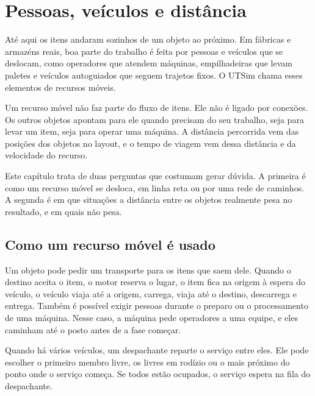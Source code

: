 \chapter{Pessoas, veículos e distância}
\label{cap-moveis}


Até aqui os itens andaram sozinhos de um objeto ao próximo. Em fábricas e armazéns reais, boa parte do trabalho é feita por pessoas e veículos que se deslocam, como operadores que atendem máquinas, empilhadeiras que levam paletes e veículos autoguiados que seguem trajetos fixos. O UTSim chama esses elementos de recursos móveis.

Um recurso móvel não faz parte do fluxo de itens. Ele não é ligado por conexões. Os outros objetos apontam para ele quando precisam do seu trabalho, seja para levar um item, seja para operar uma máquina. A distância percorrida vem das posições dos objetos no layout, e o tempo de viagem vem dessa distância e da velocidade do recurso.

Este capítulo trata de duas perguntas que costumam gerar dúvida. A primeira é como um recurso móvel se desloca, em linha reta ou por uma rede de caminhos. A segunda é em que situações a distância entre os objetos realmente pesa no resultado, e em quais não pesa.

\section{Como um recurso móvel é usado}

Um objeto pode pedir um transporte para os itens que saem dele. Quando o destino aceita o item, o motor reserva o lugar, o item fica na origem à espera do veículo, o veículo viaja até a origem, carrega, viaja até o destino, descarrega e entrega. Também é possível exigir pessoas durante o preparo ou o processamento de uma máquina. Nesse caso, a máquina pede operadores a uma equipe, e eles caminham até o posto antes de a fase começar.

Quando há vários veículos, um despachante reparte o serviço entre eles. Ele pode escolher o primeiro membro livre, os livres em rodízio ou o mais próximo do ponto onde o serviço começa. Se todos estão ocupados, o serviço espera na fila do despachante.

